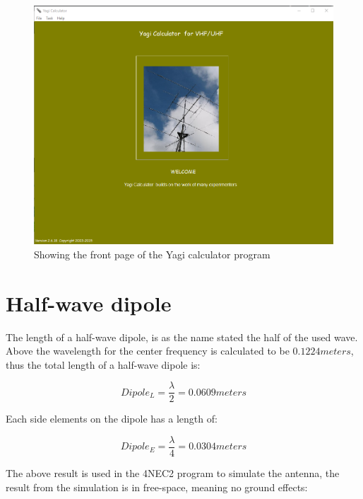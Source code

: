 \begin{figure}[h!]
\centering
\includegraphics[scale=0.5]{figures/YagiCalculator.PNG}
\caption{Showing the front page of the Yagi calculator program}
\end{figure}

\newpage

\section{Half-wave dipole}
The length of a half-wave dipole, is as the name stated the half of the used wave. Above the wavelength for the center frequency is calculated to be $0.1224meters$, thus the total length of a half-wave dipole is:

\begin{equation}
  Dipole_L = \frac{\lambda}{2} = 0.0609 meters
\end{equation}

Each side elements on the dipole has a length of:

\begin{equation}
  Dipole_E = \frac{\lambda}{4} = 0.0304 meters
\end{equation}

The above result is used in the 4NEC2 program to simulate the antenna, the result from the simulation is in free-space, meaning no ground effects: 

